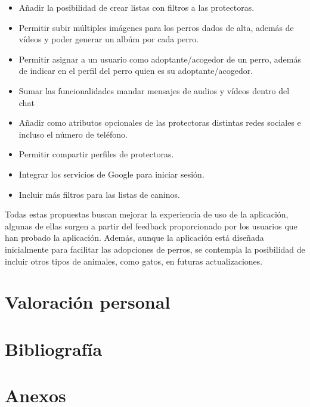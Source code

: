 \documentclass[a4paper, 12pt]{article}
\begin{document}
\begin{itemize}[noitemsep]
	\item Añadir la posibilidad de crear listas con filtros a las protectoras.
	\item Permitir subir múltiples imágenes para los perros dados de alta, además de vídeos y poder generar un albúm por cada perro.
	\item Permitir asignar a un usuario como adoptante/acogedor de un perro, además de indicar en el perfil del perro quien es su adoptante/acogedor.
	\item Sumar las funcionalidades mandar mensajes de audios y vídeos dentro del chat
	\item Añadir como atributos opcionales de las protectoras distintas redes sociales e incluso el número de teléfono.
	\item Permitir compartir perfiles de protectoras.
	\item Integrar los servicios de Google para iniciar sesión.
	\item Incluir más filtros para las listas de caninos.
\end{itemize}

Todas estas propuestas buscan mejorar la experiencia de uso de la aplicación, algunas de ellas surgen a partir del feedback proporcionado por los usuarios que han probado la aplicación. Además, aunque la aplicación está diseñada inicialmente para facilitar las adopciones de perros, se contempla la posibilidad de incluir otros tipos de animales, como gatos, en futuras actualizaciones.

\section{Valoración personal}


\newpage
\section{Bibliografía}


\newpage
\section{Anexos}

\printindex
\end{document}
